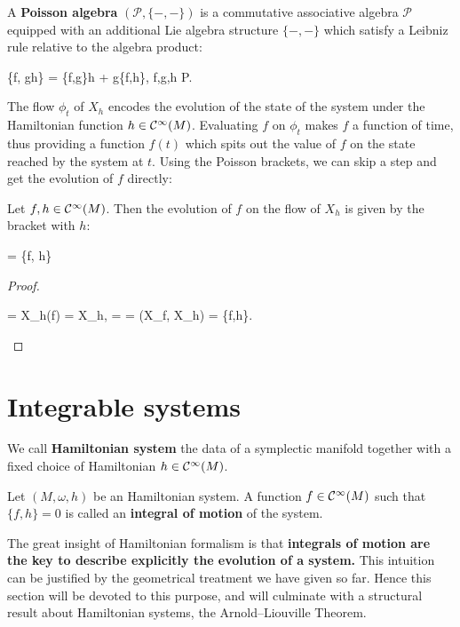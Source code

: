 \documentclass[main.tex]{subfiles}
\begin{document}
\begin{definition}
	A \textbf{Poisson algebra} $(\mathcal P, \{-,-\})$ is a commutative associative algebra $\mathcal P$ equipped with an additional Lie algebra structure $\{-,-\}$ which satisfy a Leibniz rule relative to the algebra product:
	\begin{eqalign}
		\{f, gh\} = \{f,g\}h + g\{f,h\}, \quad \forall f,g,h \in \mathcal P.
	\end{eqalign}
\end{definition}

The flow $\phi_t$ of $X_h$ encodes the evolution of the state of the system under the Hamiltonian function $h \in \mathcal{C}^\infty(M)$. Evaluating $f$ on $\phi_t$ makes $f$ a function of time, thus providing a function $f(t)$ which spits out the value of $f$ on the state reached by the system at $t$. Using the Poisson brackets, we can skip a step and get the evolution of $f$ directly:

\begin{theorem}
	Let $f, h \in \mathcal{C}^\infty(M)$. Then the evolution of $f$ on the flow of $X_h$ is given by the bracket with $h$:
	\begin{eqalign}
		 = \{f, h\}
	\end{eqalign}
\end{theorem}
\begin{proof}
	\begin{eqalign}
		 = X_h(f) = \langle X_h, \omega \rangle = \omega = \omega(X_f, X_h) = \{f,h\}.
	\end{eqalign}
\end{proof}

\section{Integrable systems}
\begin{definition}
	We call \textbf{Hamiltonian system} the data of a symplectic manifold together with a fixed choice of Hamiltonian $h \in \mathcal{C}^\infty(M)$.
\end{definition}

\begin{definition}
	Let $(M, \omega, h)$ be an Hamiltonian system. A function $f \in \mathcal{C}^\infty(M)$ such that $\{f,h\} = 0$ is called an \textbf{integral of motion} of the system.
\end{definition}

The great insight of Hamiltonian formalism is that \textbf{integrals of motion are the key to describe explicitly the evolution of a system.} This intuition can be justified by the geometrical treatment we have given so far. Hence this section will be devoted to this purpose, and will culminate with a structural result about Hamiltonian systems, the Arnold--Liouville Theorem.
\end{document}
